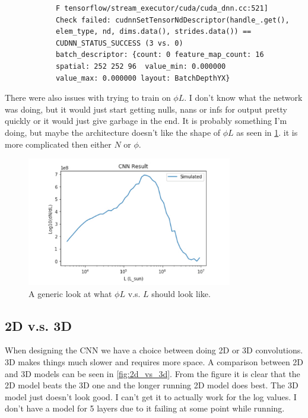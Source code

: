 \documentclass{article}
\begin{document}
		\begin{verbatim}
			F tensorflow/stream_executor/cuda/cuda_dnn.cc:521] 
			Check failed: cudnnSetTensorNdDescriptor(handle_.get(), 
			elem_type, nd, dims.data(), strides.data()) == 
			CUDNN_STATUS_SUCCESS (3 vs. 0)
			batch_descriptor: {count: 0 feature_map_count: 16 
			spatial: 252 252 96  value_min: 0.000000 
			value_max: 0.000000 layout: BatchDepthYX}
		\end{verbatim} 

		There were also issues with trying to train on \(\phi L\).  I don't know what the network was doing, but it would just start getting nulls, nans or infs for output pretty quickly or it would just give garbage in the end.  It is probably something I'm doing, but maybe the architecture doesn't like the shape of \(\phi L\) as seen in \cref{fig:phi_L}.  it is more complicated then either \(N\) or \(\phi\).

		\begin{figure}[H]
			\centering
			\includegraphics[width=0.8\textwidth]{phi_L.pdf}
			\caption{A generic look at what \(\phi L\) v.s. \(L\) should look like.}
			\label{fig:phi_L}
		\end{figure}

		\subsection{2D v.s. 3D}
			When designing the CNN we have a choice between doing 2D or 3D convolutions.  3D makes things much slower and requires more space.  A comparison between 2D and 3D models can be seen in \cref{fig:2d_vs_3d}.  From the figure it is clear that the 2D model beats the 3D one and the longer running 2D model does best.  The 3D model just doesn't look good.  I can't get it to actually work for the log values.  I don't have a model for 5 layers due to it failing at some point while running.
\end{document}
